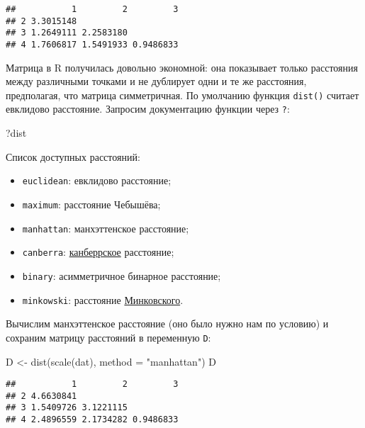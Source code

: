 \documentclass[
]{article}
\newenvironment{Shaded}{\begin{snugshade}}{\end{snugshade}}
\newcommand{\AttributeTok}[1]{\textcolor[rgb]{0.77,0.63,0.00}{#1}}
\newcommand{\FunctionTok}[1]{\textcolor[rgb]{0.00,0.00,0.00}{#1}}
\newcommand{\NormalTok}[1]{#1}
\newcommand{\OtherTok}[1]{\textcolor[rgb]{0.56,0.35,0.01}{#1}}
\newcommand{\StringTok}[1]{\textcolor[rgb]{0.31,0.60,0.02}{#1}}
\providecommand{\tightlist}{%
  \setlength{\itemsep}{0pt}\setlength{\parskip}{0pt}}
\begin{document}
\begin{verbatim}
##           1         2         3
## 2 3.3015148                    
## 3 1.2649111 2.2583180          
## 4 1.7606817 1.5491933 0.9486833
\end{verbatim}

Матрица в R получилась довольно экономной: она показывает только
расстояния между различными точками и не дублирует одни и те же
расстояния, предполагая, что матрица симметричная. По умолчанию функция
\texttt{dist()} считает евклидово расстояние. Запросим документацию
функции через \texttt{?}:

\begin{Shaded}
\begin{Highlighting}[]
\NormalTok{?dist}
\end{Highlighting}
\end{Shaded}

Список доступных расстояний:

\begin{itemize}
\tightlist
\item
  \texttt{euclidean}: евклидово расстояние;
\item
  \texttt{maximum}: расстояние Чебышёва;
\item
  \texttt{manhattan}: манхэттенское расстояние;
\item
  \texttt{canberra}:
  \href{https://en.wikipedia.org/wiki/Canberra_distance}{канберрское}
  расстояние;
\item
  \texttt{binary}: асимметричное бинарное расстояние;
\item
  \texttt{minkowski}: расстояние
  \href{https://en.wikipedia.org/wiki/Minkowski_distance}{Минковского}.
\end{itemize}

Вычислим манхэттенское расстояние (оно было нужно нам по условию) и
сохраним матрицу расстояний в переменную \texttt{D}:

\begin{Shaded}
\begin{Highlighting}[]
\NormalTok{D }\OtherTok{\textless{}{-}} \FunctionTok{dist}\NormalTok{(}\FunctionTok{scale}\NormalTok{(dat), }\AttributeTok{method =} \StringTok{"manhattan"}\NormalTok{)}
\NormalTok{D}
\end{Highlighting}
\end{Shaded}

\begin{verbatim}
##           1         2         3
## 2 4.6630841                    
## 3 1.5409726 3.1221115          
## 4 2.4896559 2.1734282 0.9486833
\end{verbatim}
\end{document}
